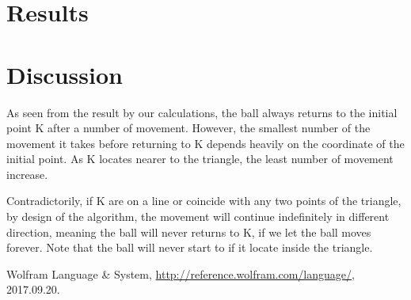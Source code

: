 \documentclass[11pt,a4paper]{article}
\begin{document}
\section{Results}



\section{Discussion}
As seen from the result by our calculations, the ball always returns to the initial point K after a number of movement. However, the smallest number of the movement it takes before returning to K depends heavily on the coordinate of the initial point. As K locates nearer to the triangle, the least number of movement increase.

Contradictorily, if K are on a line or coincide with any two points of the triangle, by design of the algorithm, the movement will continue indefinitely in different direction, meaning the ball will never returns to K, if we let the ball moves forever. Note that the ball will never start to if it locate inside the triangle.

\begin{thebibliography}{99}

 Wolfram Language \& System, \url{http://reference.wolfram.com/language/}, 2017.09.20.


\end{thebibliography}
\end{document}
